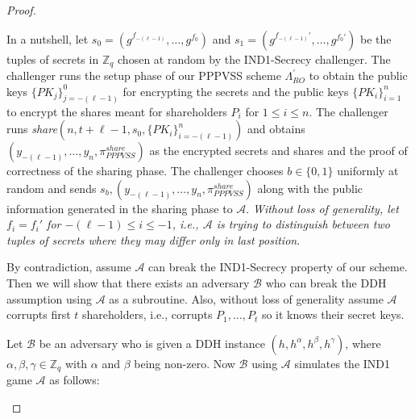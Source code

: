 \begin{proof}
\begin{itemize}
      In a nutshell, let $s_0=(g^{f_{-(\ell-1)}},\dots,g^{f_0})$ and $s_1=(g^{f_{-(\ell-1)}'},\dots,g^{f_0'})$ 
      be the tuples of secrets in $\mathbb{Z}_q$ chosen at random by the IND1-Secrecy challenger. The 
      challenger runs the setup phase of our PPPVSS scheme $\Lambda_{RO}^{'}$ to obtain the 
      public keys $\{PK_j\}_{j=-(\ell-1)}^0$ for encrypting the secrets and the public keys 
      $\{PK_i\}_{i=1}^n$ to encrypt the shares meant for shareholders $P_i$ for 
      $1\leq i\leq n$. The challenger runs \textit{share}$(n,t+\ell-1,s_0,\{PK_i\}_{i=-(\ell-1)}^n)$ 
      and obtains $(y_{-(\ell-1)},\dots,y_n,\pi_{PPPVSS}^{share})$ as the encrypted secrets and shares and 
      the proof of correctness of the sharing phase. The challenger chooses $b\in\{0,1\}$ uniformly at 
      random and sends $s_b,(y_{-(\ell-1)},\dots,y_n,\pi_{PPPVSS}^{share})$ along with the public information generated in 
      the sharing phase to $\mathcal{A}$. \textit{Without loss of generality, let $f_i=f_i'$ for 
      $-(\ell-1)\leq i\leq -1$, i.e., $\mathcal{A}$ is trying to distinguish between two tuples of 
      secrets where they may differ only in last position}.\par

      By contradiction, assume $\mathcal{A}$ can break the IND1-Secrecy property 
      of our scheme. Then we will show that there exists an adversary $\mathcal{B}$ who can 
      break the DDH assumption using $\mathcal{A}$ as a subroutine. Also, without loss of 
      generality assume $\mathcal{A}$ corrupts first $t$ shareholders, i.e., corrupts 
      $P_1,\dots,P_t$ so it knows their secret keys.\par

      Let $\mathcal{B}$ be an adversary who is given a DDH instance $(h,h^\alpha,h^\beta,h^\gamma)$, 
      where $\alpha,\beta,\gamma\in\mathbb{Z}_q$ with $\alpha$ and $\beta$ being non-zero. 
      Now $\mathcal{B}$ using $\mathcal{A}$ simulates the IND1 game $\mathcal{A}$ as follows:
      

\end{itemize}
\end{proof}
